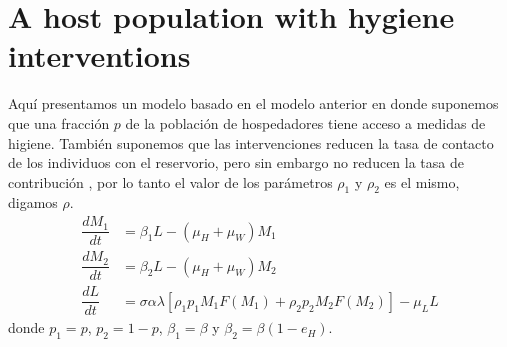 \documentclass[12pt,a4paper]{article}
\theoremstyle{plain}%
\theoremstyle{definition}
\theoremstyle{remark}
\begin{document}
	\section{A host population with hygiene interventions}
	Aquí presentamos un modelo basado en el modelo anterior en donde suponemos que 
	una fracción $p$ de la población de hospedadores tiene acceso a medidas de higiene. 
	También suponemos que las intervenciones reducen la tasa de contacto de los individuos con el reservorio, pero sin embargo no reducen la tasa de contribución%
	, por lo tanto el valor de los parámetros $\rho_1$ y $\rho_2$ es el mismo, digamos $\rho$. 
	\begin{equation}\label{model1hetero}
	\begin{split}
	\dfrac{dM_1}{dt}&=\beta_1 L - (\mu_H+\mu_W) M_1\\%
	\dfrac{d M_2}{dt}&=\beta_2 L - (\mu_{H}+\mu_W) M_2\\
	\dfrac{dL}{dt}&=\sigma \alpha \lambda \left[ \rho_1 p_1 M_1 F(M_1)+ \rho_2 p_2 M_2 F( M_2) \right]   - \mu_L L 
	\end{split}
	\end{equation} 
	donde $p_1=p$, $p_2=1-p$, $\beta_1=\beta$ y $\beta_2=\beta(1-e_H)$.
	
\end{document}
